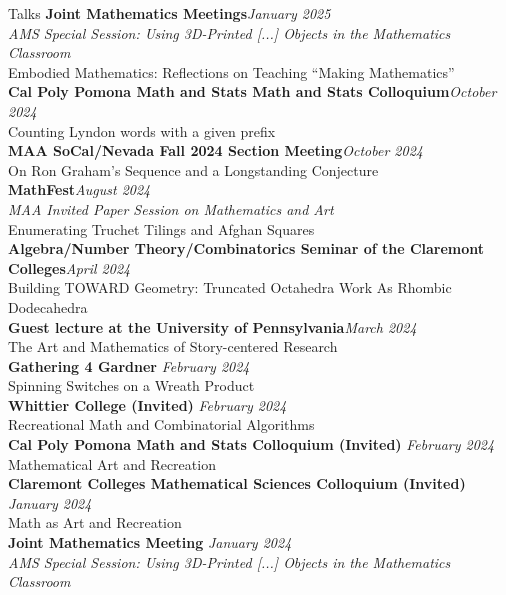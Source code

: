 \documentclass{cv} %
\begin{document}
\begin{rSection}{Talks}
  \textbf{Joint Mathematics Meetings}\hfill\textit{January 2025}
  \\ \textit{AMS Special Session: Using 3D-Printed [...] Objects in the Mathematics Classroom}
  \\ Embodied Mathematics: Reflections on Teaching ``Making Mathematics''
  \\
  \textbf{Cal Poly Pomona Math and Stats Math and Stats Colloquium}\hfill\textit{October 2024}
  \\ Counting Lyndon words with a given prefix
  \\
  \textbf{MAA SoCal/Nevada Fall 2024 Section Meeting}\hfill\textit{October 2024}
  \\ On Ron Graham's Sequence and a Longstanding Conjecture
  \\
  \textbf{MathFest}\hfill\textit{August 2024}
  \\ \textit{MAA Invited Paper Session on Mathematics and Art}
  \\ Enumerating Truchet Tilings and Afghan Squares
  \\
  \textbf{Algebra/Number Theory/Combinatorics Seminar of the Claremont Colleges}\hfill\textit{April 2024}
  \\ Building TOWARD Geometry: Truncated Octahedra Work As Rhombic Dodecahedra
  \\
  \textbf{Guest lecture at the University of Pennsylvania}\hfill\textit{March 2024}
  \\ The Art and Mathematics of Story-centered Research
  \\
  \textbf{Gathering 4 Gardner} \hfill \textit{February 2024}
  \\ Spinning Switches on a Wreath Product
  \\
  \textbf{Whittier College (Invited)} \hfill \textit{February 2024}
  \\ Recreational Math and Combinatorial Algorithms
  \\
  \textbf{Cal Poly Pomona Math and Stats Colloquium (Invited)} \hfill \textit{February 2024}
  \\ Mathematical Art and Recreation
  \\
  \textbf{Claremont Colleges Mathematical Sciences Colloquium (Invited)} \hfill \textit{January 2024}
  \\ Math as Art and Recreation
  \\
  \textbf{Joint Mathematics Meeting} \hfill \textit{January 2024}
  \\ \textit{AMS Special Session: Using 3D-Printed [...] Objects in the Mathematics Classroom}

\end{rSection}
\end{document}
